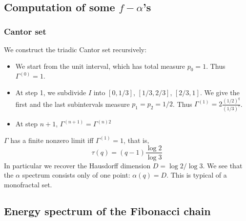 \documentclass[11pt]{article}
\begin{document}
\subsection{Computation of some $f -\alpha$'s}

\subsubsection{Cantor set}
We construct the triadic Cantor set recursively:
\begin{itemize}
	\item  We start from the unit interval, which has total measure $p_0 = 1$. Thus $\Gamma^{(0)} = 1$.
	\item At step 1, we subdivide $I$ into $[0,1/3]$, $[1/3,2/3]$, $[2/3,1]$. We give the first and the last subintervals measure $p_1 = p_2 = 1/2$. Thus $\Gamma^{(1)} = 2 \frac{(1/2)^q}{(1/3)^\tau}$.
	\item At step $n+1$, $\Gamma^{(n+1)} = \Gamma^{(n)2}$
\end{itemize}
$\Gamma$ has a finite nonzero limit iff $\Gamma^{(1)} = 1$, that is,
\begin{equation}
	\tau(q) =(q-1) \frac{\log 2}{\log 3}
\end{equation}
In particular we recover the Hausdorff dimension $D = \log 2/ \log 3$. We see that the $\alpha$ spectrum consists only of one point: $\alpha(q) = D$. This is typical of a monofractal set.

\subsection{Energy spectrum of the Fibonacci chain}
\end{document}
